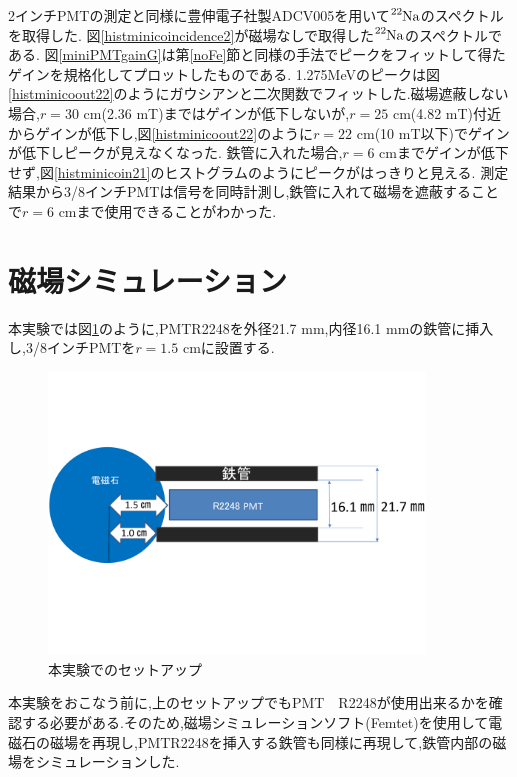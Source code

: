 2インチPMTの測定と同様に豊伸電子社製ADC\hspace{3pt}V005を用いて$\ce{^{22}Na}$のスペクトルを取得した.
図\ref{histminicoincidence2}が磁場なしで取得した$\ce{^{22}Na}$のスペクトルである.
図\ref{miniPMTgainG}は第\ref{noFe}節と同様の手法でピークをフィットして得たゲインを規格化してプロットしたものである.
1.275MeVのピークは図\ref{histminicoout22}のようにガウシアンと二次関数でフィットした.磁場遮蔽しない場合,$r=30$ cm(2.36 mT)まではゲインが低下しないが,$r=25$ cm(4.82 mT)付近からゲインが低下し,図\ref{histminicoout22}のように$r=22$ cm(10 mT以下)でゲインが低下しピークが見えなくなった.
鉄管に入れた場合,$r=6$ cmまでゲインが低下せず,図\ref{histminicoin21}のヒストグラムのようにピークがはっきりと見える.
測定結果から3/8インチPMTは信号を同時計測し,鉄管に入れて磁場を遮蔽することで$r=6$ cmまで使用できることがわかった.

\section{磁場シミュレーション}
本実験では図\ref{honjikken}のように,PMT\hspace{3pt}R2248を外径21.7 mm,内径16.1 mmの鉄管に挿入し,3/8インチPMTを$r=1.5$ cmに設置する.

\begin{figure}[tbp]
	\centering
		\includegraphics[width=10cm]{fig/iguchi/honjikken.pdf}
	\caption{本実験でのセットアップ}
	\label{honjikken}
\end{figure}

本実験をおこなう前に,上のセットアップでもPMT　R2248が使用出来るかを確認する必要がある.そのため,磁場シミュレーションソフト(Femtet)を使用して電磁石の磁場を再現し,PMT\hspace{3pt}R2248を挿入する鉄管も同様に再現して,鉄管内部の磁場をシミュレーションした.

